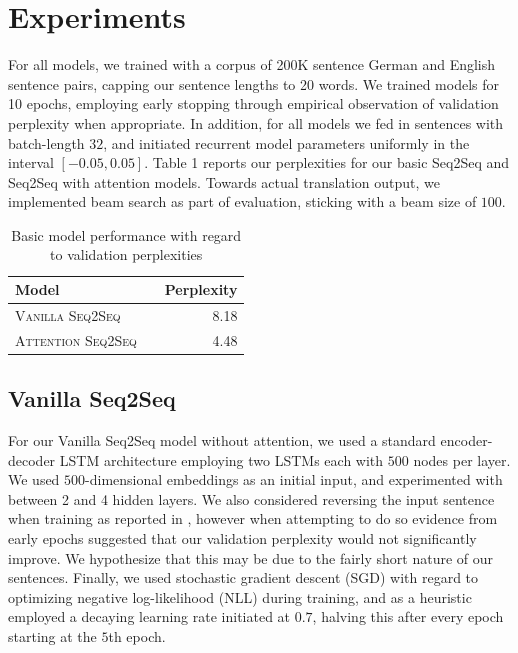 \documentclass[11pt]{article}
\begin{document}
\section{Experiments}
For all models, we trained with a corpus of 200K sentence German and English sentence pairs, capping our sentence lengths to 20 words. We trained models for 10 epochs, employing early stopping through empirical observation of validation perplexity when appropriate. In addition, for all models we fed in sentences with batch-length $32$, and initiated recurrent model parameters uniformly in the interval $[-0.05, 0.05]$. Table 1 reports our perplexities for our basic Seq2Seq and Seq2Seq with attention models. Towards actual translation output, we implemented beam search as part of evaluation, sticking with a beam size of $100$. \\

\begin{table}[h]
\centering
\begin{tabular}{llr}
 \toprule
 Model &  & Perplexity \\
 \midrule
 \textsc{Vanilla Seq2Seq} & & 8.18\\
 \textsc{Attention Seq2Seq} & & 4.48 \\
 \bottomrule
\end{tabular}
\caption{\label{tab:results} Basic model performance with regard to validation perplexities}
\end{table}

\subsection{Vanilla Seq2Seq}
For our Vanilla Seq2Seq model without attention, we used a standard encoder-decoder LSTM architecture employing two LSTMs each with $500$ nodes per layer. We used $500$-dimensional embeddings as an initial input, and experimented with between 2 and 4 hidden layers. We also considered reversing the input sentence when training as reported in \cite{43155}, however when attempting to do so evidence from early epochs suggested that our validation perplexity would not significantly improve. We hypothesize that this may be due to the fairly short nature of our sentences. Finally, we used stochastic gradient descent (SGD) with regard to optimizing negative log-likelihood (NLL) during training, and as a heuristic employed a decaying learning rate initiated at $0.7$, halving this after every epoch starting at the $5$th epoch.
\end{document}

